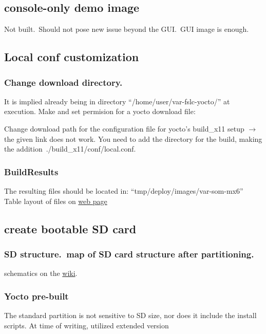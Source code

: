 \documentclass[10pt]{article}
\begin{document}
\subsection{console-only demo image}
Not built.\ Should not pose new issue beyond the GUI.\ GUI image is enough.

\subsection{Local conf customization}

\subsubsection{Change download directory.}
It is implied already being in directory ``/home/user/var-fslc-yocto/'' at execution.
Make and set permision for a yocto download file:

Change download path for the configuration file for yocto's build\_x11 setup $\rightarrow$ the given link does not work. You need to add the directory for the
build, making the addition~./build\_x11/conf/local.conf.


\subsubsection{BuildResults}
The resulting files should be located in:  ``tmp/deploy/images/var-som-mx6'' Table layout of files on
\href{http://variwiki.com/index.php?title=Yocto_Build_Release&release=RELEASE_SUMO_V1.1_VAR-SOM-MX6#Build_Results}{web page}

\subsection{create bootable SD card}

\subsubsection{SD structure.\ map of SD card structure after partitioning.}
schematics on the \href{http://variwiki.com/index.php?title=Yocto_Build_Release&release=RELEASE_SUMO_V1.1_VAR-SOM-MX6#SD_card_structure}{wiki}.

\subsubsection{Yocto pre-built}
The standard partition is not sensitive to SD size, nor does it include the install scripts. At time of writing, utilized extended version
\end{document}
